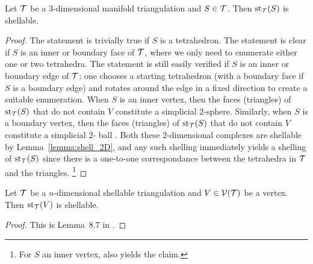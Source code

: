 \documentclass[10pt,letterpaper]{article}
\newcommand\cye[1]{%
\protect\leavevmode
\begingroup
    \color{red!35!yellow}%
    #1%
\endgroup
}
\newcommand{\disk}{\cye{ball}}
\begin{document}
\begin{lemma}
    Let ${\mathcal T}$ be a $3$-dimensional manifold triangulation and $S \in {\mathcal T}$.
    Then $\operatorname{st}_{{\mathcal T}}(S)$ is shellable. 
\end{lemma}
\begin{proof}
    The statement is trivially true if $S$ is a tetrahedron. 
    The statement is clear if $S$ is an inner or boundary face of ${\mathcal T}$,
    where we only need to enumerate either one or two tetrahedra. 
    The statement is still easily verified if $S$ is an inner or boundary edge of ${\mathcal T}$:
    one chooses a starting tetrahedron (with a boundary face if $S$ is a boundary edge) and rotates around the edge in a fixed direction to create a suitable enumeration. 
    When $S$ is an inner vertex, then the faces (triangles) of $\operatorname{st}_{{\mathcal T}}(S)$ that do not contain $V$ constitute a simplicial $2$-sphere.
    Similarly, when $S$ is a boundary vertex, then the faces (triangles) of $\operatorname{st}_{{\mathcal T}}(S)$ that do not contain $V$ constitute a simplicial $2$-\disk.
    Both these $2$-dimensional complexes are shellable by Lemma~\ref{lemma:shell_2D}, and any such shelling immediately yields a shelling of $\operatorname{st}_{{\mathcal T}}(S)$ since there is a one-to-one correspondance between the tetrahedra in ${\mathcal T}$ and the triangles.
    \footnote{For $S$ an inner vertex, \cite[Lemma~B.1]{ern2020stable} also yields the claim.}
\end{proof}


\begin{lemma}\label{lemma:stars_are_shellable}
    Let ${\mathcal T}$ be a $n$-dimensional shellable triangulation and $V \in {\mathcal V}({\mathcal T})$ be a vertex.
    Then $\operatorname{st}_{{\mathcal T}}(V)$ is shellable. 
\end{lemma}
\begin{proof}
    This is Lemma~8.7 in \cite{ziegler1995lectures}.
\end{proof}
\end{document}
